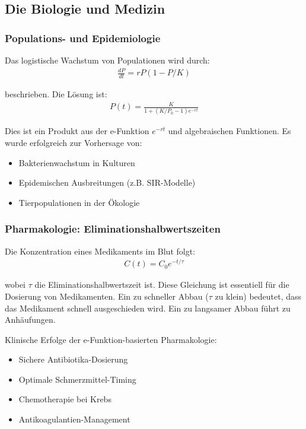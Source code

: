 \documentclass[a4paper, 12pt, twoside, openright]{report}
\theoremstyle{definition}
\theoremstyle{definition}
\begin{document}
\subsection{Die Biologie und Medizin}

\subsubsection*{Populations- und Epidemiologie}

Das logistische Wachstum von Populationen wird durch:
\begin{align}
	\frac{dP}{dt} = r P (1 - P/K)
\end{align}

beschrieben. Die Lösung ist:
\begin{align}
	P(t) = \frac{K}{1 + (K/P_0 - 1) e^{-rt}}
\end{align}

Dies ist ein Produkt aus der e-Funktion $e^{-rt}$ und algebraischen Funktionen. Es wurde erfolgreich zur Vorhersage von:
\begin{itemize}
	\item[-] Bakterienwachstum in Kulturen
	\item[-] Epidemischen Ausbreitungen (z.B. SIR-Modelle)
	\item[-] Tierpopulationen in der Ökologie
\end{itemize}

\subsubsection*{Pharmakologie: Eliminationshalbwertszeiten}

Die Konzentration eines Medikaments im Blut folgt:
\begin{align}
	C(t) = C_0 e^{-t/\tau}
\end{align}

wobei $\tau$ die Eliminationshalbwertszeit ist. Diese Gleichung ist essentiell für die Dosierung von Medikamenten. Ein zu schneller Abbau ($\tau$ zu klein) bedeutet, dass das Medikament schnell ausgeschieden wird. Ein zu langsamer Abbau führt zu Anhäufungen.

Klinische Erfolge der e-Funktion-basierten Pharmakologie:
\begin{itemize}
	\item[-] Sichere Antibiotika-Dosierung
	\item[-] Optimale Schmerzmittel-Timing
	\item[-] Chemotherapie bei Krebs
	\item[-] Antikoagulantien-Management
\end{itemize}
\end{document}
